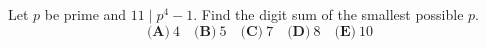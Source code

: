 Let $p$ be prime and $11\mid p^4-1$. Find the digit sum of the smallest possible $p$.
\[\textbf{(A)}~4\quad\textbf{(B)}~5\quad\textbf{(C)}~7\quad\textbf{(D)}~8\quad\textbf{(E)}~10\]
